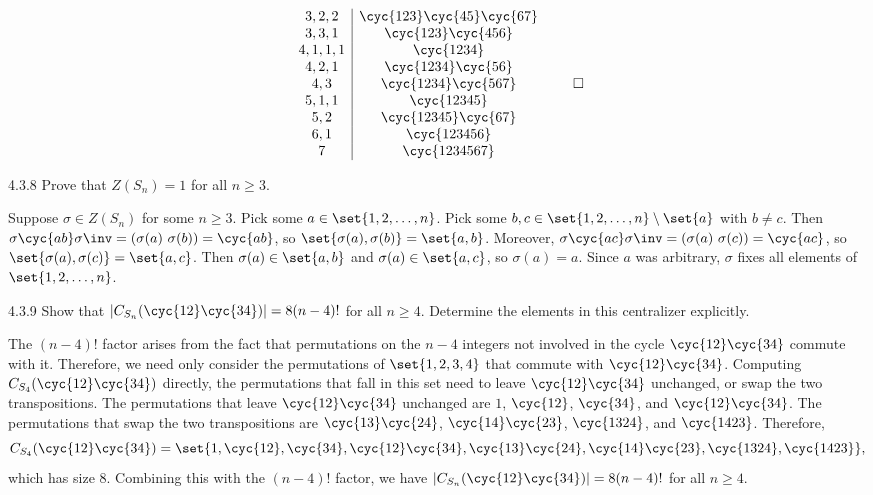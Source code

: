 \begin{sol}
\[\begin{array}{c|c}
			3, 2, 2 & \cyc{1 2 3}\cyc{4 5}\cyc{6 7} \\
			3, 3, 1 & \cyc{1 2 3}\cyc{4 5 6} \\
			4, 1, 1, 1 & \cyc{1 2 3 4} \\
			4, 2, 1 & \cyc{1 2 3 4}\cyc{5 6} \\
			4, 3 & \cyc{1 2 3 4}\cyc{5 6 7} \\
			5, 1, 1 & \cyc{1 2 3 4 5} \\
			5, 2 & \cyc{1 2 3 4 5}\cyc{6 7} \\
			6, 1 & \cyc{1 2 3 4 5 6} \\
			7 & \cyc{1 2 3 4 5 6 7}
		\end{array} \qedhere
	\]
\end{sol}

\begin{exercise}{4.3.8}
	Prove that $Z(S_n)=1$ for all $n \ge 3$.
\end{exercise}

\begin{sol}
	Suppose $\sigma \in Z(S_n)$ for some $n \geq 3$.
	Pick some $a \in \set{1, 2, \ldots, n}$.
	Pick some $b, c \in \set{1, 2, \ldots, n} \setminus \set{a}$ with $b \neq c$.
	Then $\sigma\cyc{a b}\sigma\inv = (\sigma(a)\ \sigma(b)) = \cyc{a b}$, so $\set{\sigma(a), \sigma(b)} = \set{a, b}$.
	Moreover, $\sigma\cyc{a c}\sigma\inv = (\sigma(a)\ \sigma(c)) = \cyc{a c}$, so $\set{\sigma(a), \sigma(c)} = \set{a, c}$.
	Then $\sigma(a) \in \set{a, b}$ and $\sigma(a) \in \set{a, c}$, so $\sigma(a) = a$.
	Since $a$ was arbitrary, $\sigma$ fixes all elements of $\set{1, 2, \ldots, n}$.
\end{sol}

\begin{exercise}{4.3.9}
	Show that $|C_{S_n}(\cyc{1 2}\cyc{3 4})| = 8 (n-4)!$ for all $n \ge 4$.
	Determine the elements in this centralizer explicitly.
\end{exercise}

\begin{sol}
	The $(n - 4)!$ factor arises from the fact that permutations on the $n - 4$ integers not involved in the cycle $\cyc{1 2}\cyc{3 4}$ commute with it.
	Therefore, we need only consider the permutations of $\set{1, 2, 3, 4}$ that commute with $\cyc{1 2}\cyc{3 4}$.
	Computing $C_{S_4}(\cyc{1 2}\cyc{3 4})$ directly, the permutations that fall in this set need to leave $\cyc{1 2}\cyc{3 4}$ unchanged, or swap the two transpositions.
	The permutations that leave $\cyc{1 2}\cyc{3 4}$ unchanged are $1$, $\cyc{1 2}$, $\cyc{3 4}$, and $\cyc{1 2}\cyc{3 4}$.
	The permutations that swap the two transpositions are $\cyc{1 3}\cyc{2 4}$, $\cyc{1 4}\cyc{2 3}$, $\cyc{1 3 2 4}$, and $\cyc{1 4 2 3}$.
	Therefore, 
	\[
		C_{S_4}(\cyc{1 2}\cyc{3 4}) = \set{1, \cyc{1 2}, \cyc{3 4}, \cyc{1 2}\cyc{3 4}, \cyc{1 3}\cyc{2 4}, \cyc{1 4}\cyc{2 3}, \cyc{1 3 2 4}, \cyc{1 4 2 3}},
	\]
	which has size 8.
	Combining this with the $(n - 4)!$ factor, we have $|C_{S_n}(\cyc{1 2}\cyc{3 4})| = 8(n - 4)!$ for all $n \geq 4$.
\end{sol}


